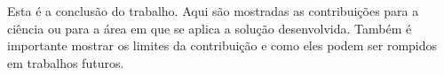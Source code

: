 \label{Conclusao}

Esta é a conclusão do trabalho. 
Aqui são mostradas as contribuições para a ciência ou para a área em que se aplica a solução desenvolvida.
Também é importante mostrar os limites da contribuição e como eles podem ser rompidos em trabalhos futuros.